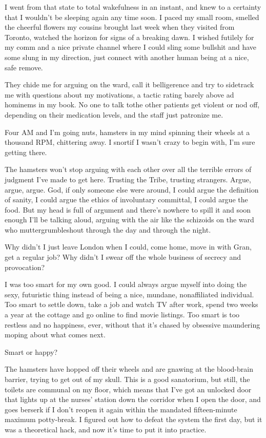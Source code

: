 I went from that state to total wakefulness in an instant, and knew
to a certainty that I wouldn’t be sleeping again any time soon. I
paced my small room, smelled the cheerful flowers my cousins
brought last week when they visited from Toronto, watched the
horizon for signs of a breaking dawn. I wished futilely for my comm
and a nice private channel where I could sling some bullshit and
have some slung in my direction, just connect with another human
being at a nice, safe remove.

They chide me for arguing on the ward, call it belligerence and try
to sidetrack me with questions about my motivations, a tactic
rating barely above ad hominems in my book. No one to talk to{\dash}the
other patients get violent or nod off, depending on their
medication levels, and the staff just patronize me.

Four AM and I’m going nuts, hamsters in my mind spinning their
wheels at a thousand RPM, chittering away. I snort{\dash}if I wasn’t
crazy to begin with, I’m sure getting there.

The hamsters won’t stop arguing with each other over all the
terrible errors of judgment I’ve made to get here. Trusting the
Tribe, trusting strangers. Argue, argue, argue. God, if only
someone else were around, I could argue the definition of sanity, I
could argue the ethics of involuntary committal, I could argue the
food. But my head is full of argument and there’s nowhere to spill
it and soon enough I’ll be talking aloud, arguing with the air like
the schizoids on the ward who muttergrumbleshout through the day
and through the night.

Why didn’t I just leave London when I could, come home, move in
with Gran, get a regular job? Why didn’t I swear off the whole
business of secrecy and provocation?

I was too smart for my own good. I could always argue myself into
doing the sexy, futuristic thing instead of being a nice, mundane,
nonaffiliated individual. Too smart to settle down, take a job and
watch TV after work, spend two weeks a year at the cottage and go
online to find movie listings. Too smart is too restless and no
happiness, ever, without that it’s chased by obsessive maundering
moping about what comes next.

Smart or happy?

The hamsters have hopped off their wheels and are gnawing at the
blood-brain barrier, trying to get out of my skull. This is a good
sanatorium, but still, the toilets are communal on my floor, which
means that I’ve got an unlocked door that lights up at the nurses’
station down the corridor when I open the door, and goes berserk if
I don’t reopen it again within the mandated fifteen-minute maximum
potty-break. I figured out how to defeat the system the first day,
but it was a theoretical hack, and now it’s time to put it into
practice.

